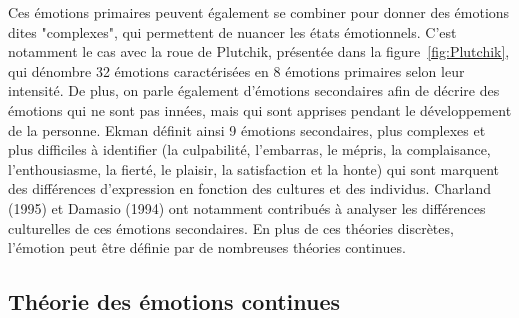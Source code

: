 Ces émotions primaires peuvent également se combiner pour donner des émotions dites "complexes", qui permettent de nuancer les états émotionnels. C'est notamment le cas avec la roue de Plutchik, présentée dans la figure~\ref{fig:Plutchik}, qui dénombre 32 émotions caractérisées en 8 émotions primaires selon leur intensité. De plus, on parle également d'émotions secondaires afin de décrire des émotions qui ne sont pas innées, mais qui sont apprises pendant le développement de la personne. Ekman définit ainsi 9 émotions secondaires, plus complexes et plus difficiles à identifier (la culpabilité, l'embarras, le mépris, la complaisance, l'enthousiasme, la fierté, le plaisir, la satisfaction et la honte) qui sont marquent des différences d'expression en fonction des cultures et des individus. Charland (1995) et Damasio (1994) ont notamment contribués à analyser les différences culturelles de ces émotions secondaires.
En plus de ces théories discrètes, l'émotion peut être définie par de nombreuses théories continues.

\subsection{Théorie des émotions continues}

